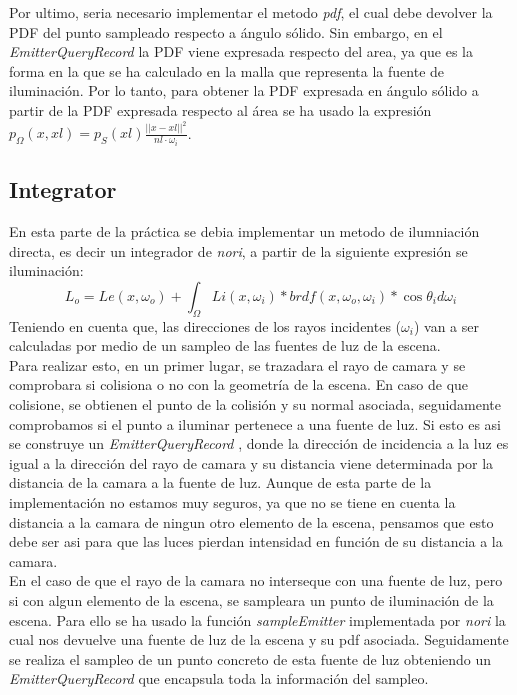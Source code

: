\documentclass[10pt,oneside,a4paper]{article}
\begin{document}
Por ultimo, seria necesario implementar el metodo \textit{pdf}, el cual debe devolver la PDF del punto sampleado respecto a ángulo sólido. Sin embargo, en el  \textit{EmitterQueryRecord} la PDF viene expresada respecto del area, ya que es la forma en la que se ha calculado en la malla que representa la fuente de iluminación. Por lo tanto, para obtener la PDF expresada en ángulo sólido a partir de la PDF expresada respecto al área se ha usado la expresión $p_\Omega(x,xl) = p_S(xl)\frac{||x-xl||^2}{nl\cdot\omega_i}$.\\

\subsection{Integrator}
En esta parte de la práctica se debia implementar un metodo de ilumniación directa, es decir un integrador de \textit{nori}, a partir de la siguiente expresión se iluminación:
$$L_o = Le(x,\omega_o) + \int_\Omega Li(x,\omega_i) * brdf(x,\omega_o,\omega_i)  * \cos\theta_i d\omega_i$$
Teniendo en cuenta que, las direcciones de los rayos incidentes ($\omega_i$) van a ser calculadas por medio de un sampleo de las fuentes de luz de la escena.\\

Para realizar esto, en un primer lugar, se trazadara el rayo de camara y se comprobara si colisiona o no con la geometría de la escena. En caso de que colisione, se obtienen el punto de la colisión y su normal asociada, seguidamente comprobamos si el punto a iluminar pertenece a una fuente de luz. Si esto es asi se construye un \textit{EmitterQueryRecord} , donde la dirección de incidencia a la luz es igual a la dirección del rayo de camara y su distancia viene determinada por la distancia de la camara a la fuente de luz. Aunque de esta parte de la implementación no estamos muy seguros, ya que no se tiene en cuenta la distancia a la camara de ningun otro elemento de la escena, pensamos que esto debe ser asi para que las luces pierdan intensidad en función de su distancia a la camara.\\

En el caso de que el rayo de la camara no interseque con una fuente de luz, pero si con algun elemento de la escena, se sampleara un punto de iluminación de la escena. Para ello se ha usado la función \textit{sampleEmitter} implementada por \textit{nori} la cual nos devuelve una fuente de luz de la escena y su pdf asociada. Seguidamente se realiza el sampleo de un punto concreto de esta fuente de luz obteniendo un \textit{EmitterQueryRecord} que encapsula toda la información del sampleo.\\
\end{document}

